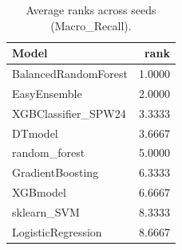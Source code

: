 \begin{table}[t]
\centering
\begin{tabular}{lr}
\toprule
Model & rank \\
\midrule
BalancedRandomForest & 1.0000 \\
EasyEnsemble & 2.0000 \\
XGBClassifier_SPW24 & 3.3333 \\
DTmodel & 3.6667 \\
random_forest & 5.0000 \\
GradientBoosting & 6.3333 \\
XGBmodel & 6.6667 \\
sklearn_SVM & 8.3333 \\
LogisticRegression & 8.6667 \\
\bottomrule
\end{tabular}
\caption{Average ranks across seeds (Macro_Recall).}
\label{tab:avg_rank_Macro_Recall}
\end{table}